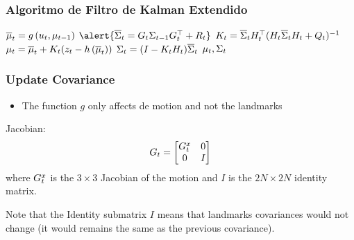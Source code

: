 \begin{frame}
    \frametitle{Algoritmo de Filtro de Kalman Extendido}
    
    \begin{algorithmic}[1]
        \State $\overline{\mu}_{t} = g\left( u_{t}, \mu_{t-1} \right)$
        \State $\alert{\overline{\covariance}_{t} = \motionModelJacobian_{t} \covariance_{t-1} \motionModelJacobian_{t}^{\top}+\motionParametersCovariance_{t}}$
        \Statex
        \State $K_{t} = \overline{\Sigma}_{t} H_{t}^{\top} (H_{t} \overline{\Sigma}_{t}  H_{t} + Q_{t})^{-1} $
        \State $\mu_{t} = \overline{\mu}_{t} + K_{t} (z_{t} - h\left( \overline{\mu}_{t} \right))$
        \State $\Sigma_{t} =  (I - K_{t} H_{t}) \overline{\Sigma}_{t}$
        \State \Return $\mu_{t}, \Sigma_{t}$
    \EndProcedure
    \end{algorithmic}
\end{frame}

\begin{frame}
    \frametitle{Update Covariance}

    \begin{itemize}
        \item The function $g$ only affects de motion and not the landmarks
    \end{itemize}

    Jacobian:
    \begin{equation*}
        G_t = 
        \begin{bmatrix}
            G_{t}^{x} & 0 \\
            0 & I
        \end{bmatrix}
    \end{equation*}
    where $G_{t}^{x}$ is the $3 \times 3$ Jacobian of the motion and $I$ is the $2N \times 2N$ identity matrix.


    Note that the Identity submatrix $I$ means that landmarks covariances would not change (it would remains the same as the previous covariance).

\end{frame}


